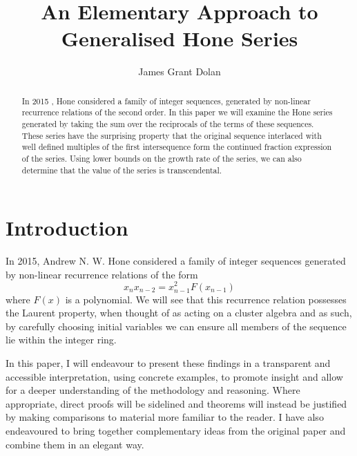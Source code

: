 \documentclass{article}
\title{An Elementary Approach to Generalised Hone Series}
\author{James Grant Dolan}
\theoremstyle{remark}
\theoremstyle{definition}
\begin{document}
\maketitle

\tableofcontents

\begin{abstract}
    In 2015 \cite{hone2015curious}, Hone considered a family of integer sequences, generated by non-linear recurrence relations of the second order. In this paper we will examine the Hone series generated by taking the sum over the reciprocals of the terms of these sequences. These series have the surprising property that the original sequence interlaced with well defined multiples of the first intersequence form the continued fraction expression of the series. Using lower bounds on the growth rate of the series, we can also determine that the value of the series is transcendental.
\end{abstract}
\newpage

\section*{Introduction}

\iffalse
In 2015, Andrew N. W. Hone considered a family of integer sequences \cite{hone2015curious} generated by non-linear recurrence relations of the form
\begin{equation}
    x_n x_{n-2} = x_{n-1}^2 F(x_{n-1})
\end{equation}
where $F(x)$ is a polynomial. We will see that this recurrence relation possesses the Laurent property, when thought of as acting on a cluster algebra and as such, by carefully choosing initial variables we can ensure all members of the sequence lie within the integer ring.

In this paper, I will endeavour to present these findings in a transparent and accessible interpretation, using concrete examples, to promote insight and allow for a deeper understanding of the methodology and reasoning. Where appropriate, direct proofs will be sidelined and theorems will instead be justified by making comparisons to material more familiar to the reader. I have also endeavoured to bring together complementary ideas from the original paper and combine them in an elegant way.
\end{document}
